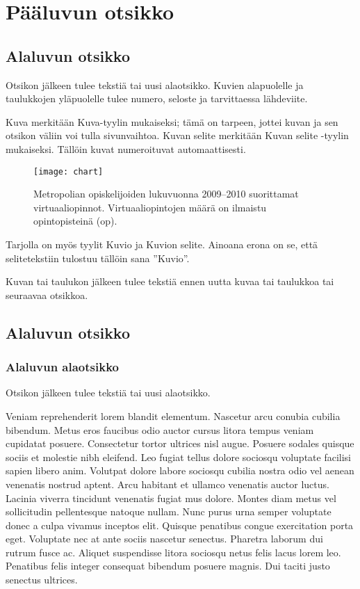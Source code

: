 \chapter{Pääluvun otsikko}

\section{Alaluvun otsikko}
Otsikon jälkeen tulee tekstiä tai uusi alaotsikko. Kuvien alapuolelle ja taulukkojen yläpuolelle tulee numero, seloste ja tarvittaessa lähdeviite.

Kuva merkitään Kuva-tyylin mukaiseksi; tämä on tarpeen, jottei kuvan ja sen otsikon väliin voi tulla sivunvaihtoa. Kuvan selite merkitään Kuvan selite -tyylin mukaiseksi. Tällöin kuvat numeroituvat automaattisesti.

\begin{figure}[h]
  \texttt{[image: chart]}
  \caption{Metropolian opiskelijoiden lukuvuonna 2009–2010 suorittamat virtuaaliopinnot. Virtuaaliopintojen määrä on ilmaistu opintopisteinä (op).}
  \label{fig:chart}
\end{figure}

Tarjolla on myös tyylit Kuvio ja Kuvion selite. Ainoana erona on se, että selitetekstiin tulostuu tällöin sana ”Kuvio”.

Kuvan tai taulukon jälkeen tulee tekstiä ennen uutta kuvaa tai taulukkoa tai seuraavaa otsikkoa.

\section{Alaluvun otsikko}

\subsection{Alaluvun alaotsikko}

Otsikon jälkeen tulee tekstiä tai uusi alaotsikko.

Veniam reprehenderit lorem blandit elementum. Nascetur arcu conubia cubilia bibendum. Metus eros faucibus odio auctor cursus litora tempus veniam cupidatat posuere. Consectetur tortor ultrices nisl augue. Posuere sodales quisque sociis et molestie nibh eleifend. Leo fugiat tellus dolore sociosqu voluptate facilisi sapien libero anim. Volutpat dolore labore sociosqu cubilia nostra odio vel aenean venenatis nostrud aptent. Arcu habitant et ullamco venenatis auctor luctus.
Lacinia viverra tincidunt venenatis fugiat mus dolore. Montes diam metus vel sollicitudin pellentesque natoque nullam. Nunc purus urna semper voluptate donec a culpa vivamus inceptos elit. Quisque penatibus congue exercitation porta eget. Voluptate nec at ante sociis nascetur senectus. Pharetra laborum dui rutrum fusce ac. Aliquet suspendisse litora sociosqu netus felis lacus lorem leo. Penatibus felis integer consequat bibendum posuere magnis. Dui taciti justo senectus ultrices.

